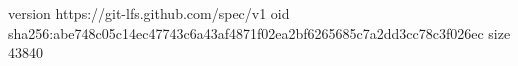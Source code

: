 version https://git-lfs.github.com/spec/v1
oid sha256:abe748c05c14ec47743c6a43af4871f02ea2bf6265685c7a2dd3cc78c3f026ec
size 43840
